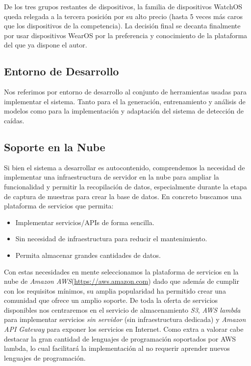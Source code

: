 De los tres grupos restantes de dispositivos, la familia de dispositivos WatchOS queda relegada a la tercera posición por su alto precio (hasta 5 veces más caros que los dispositivos de la competencia). La decisión final se decanta finalmente por usar dispositivos WearOS por la preferencia y conocimiento de la plataforma del que ya dispone el autor.

\subsection{Entorno de Desarrollo}

Nos referimos por entorno de desarrollo al conjunto de herramientas usadas para implementar el sistema. Tanto para el la generación, entrenamiento y análisis de modelos como para la implementación y adaptación del sistema de detección de caídas.



\subsection{Soporte en la Nube}\label{sec:req:nube}

Si bien el sistema a desarrollar es autocontenido, comprendemos la necesidad de implementar una infraestructura de servidor en la nube para ampliar la funcionalidad y permitir la recopilación de datos, especialmente durante la etapa de captura de muestras para crear la base de datos. En concreto buscamos una plataforma de servicios que permita:

\begin{itemize}
  \item Implementar servicios/APIs de forma sencilla.
  \item Sin necesidad de infraestructura para reducir el mantenimiento.
  \item Permita almacenar grandes cantidades de datos.
\end{itemize}

Con estas necesidades en mente seleccionamos la plataforma de servicios en la nube de \textit{Amazon AWS}(\url{https://aws.amazon.com}) dado que además de cumplir con los requisitos mínimos, su amplia popularidad ha permitido crear una comunidad que ofrece un amplio soporte. De toda la oferta de servicios disponibles nos centraremos en el servicio de almacenamiento \textit{S3}, \textit{AWS lambda} para implementar servicios \textit{sin servidor} (sin infraestructura dedicada) y \textit{Amazon API Gateway} para exponer los servicios en Internet. Como extra a valorar cabe destacar la gran cantidad de lenguajes de programación soportados por AWS lambda, lo cual facilitará la implementación al no requerir aprender nuevos lenguajes de programación.

